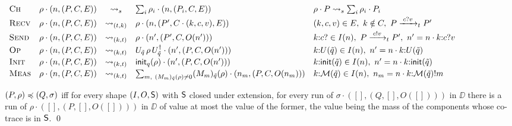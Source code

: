\begin{table}[ht]
\centering
\footnotesize
$\begin{array}{l@{\quad}rcl@{\quad}l}
\textsc{Ch} & \rho \cdot (n,(P,C,E)) &\lstep{s}& \textstyle\sum_i \rho_i \cdot (n,(P_i,C,E))
  & \rho \cdot P \lstep{s} \sum_i \rho_i \cdot P_i \\[2pt]
\textsc{Recv} & \rho \cdot (n,(P,C,E)) &\lstep{(t,k)}& \rho \cdot (n,(P',C \cdot (k,c,v),E))
  & (k,c,v) \in E,\ k \notin C,\ P \step{c?v}{t} P' \\[2pt]
\textsc{Send} & \rho \cdot (n,(P,C,E)) &\lstep{(k,t)}& \rho \cdot (n',(P',C,O(n')))
  & k{:}c? \in I(n),\ P \step{c!v}{t} P',\ n' = n \cdot k{:}c?v \\[2pt]
\textsc{Op} & \rho \cdot (n,(P,C,E)) &\lstep{(k,t)}& \upd{U} \cdot (n',(P,C,O(n')))
  & k{:}U(\tilde q) \in I(n),\ n' = n \cdot k{:}U(\tilde q) \\[2pt]
\textsc{Init} & \rho \cdot (n,(P,C,E)) &\lstep{(k,t)}& \inirho \cdot (n',(P,C,O(n')))
  & k{:}\mathsf{init}(\tilde q) \in I(n),\ n' = n \cdot k{:}\mathsf{init}(\tilde q) \\[2pt]
\textsc{Meas} & \rho \cdot (n,(P,C,E)) &\lstep{(k,t)}& \textstyle\sum_{m,\ \br \neq 0} \br \cdot (n_m,(P,C,O(n_m)))
  & k{:}\M(\tilde q) \in I(n),\ n_m = n \cdot k{:}\M(\tilde q)!m
\end{array}$
\caption{The step of a component of $\DD$, for a shape $(I, O, \succn)$.}
\label{tab:dlts}
\end{table}

\begin{definition}\label{def:alt}
$(P,\rho) \preccurlyeq (Q,\sigma)$ iff for every shape $(I, O, \succn)$ with
$\mathsf{S}$ closed under extension, for every run of
$\sigma \cdot ([],(Q,[],O([])))$ in $\DD$ there is a run of
$\rho \cdot ([],(P,[],O([])))$ in $\DD$ of value at most the value of the
former, the value being the mass of the components whose co-trace is in
$\mathsf{S}$.
\qed
\end{definition}

